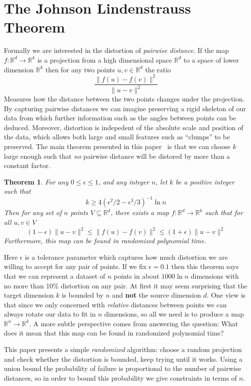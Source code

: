 \documentclass[11pt]{article}
\newcommand{\arr}{\rightarrow}
\newcommand{\R}{\mathbb{R}}
\newtheorem{Thm}{Theorem}
\begin{document}
\section{The Johnson Lindenstrauss Theorem}
Formally we are interested in the distortion of \textit{pairwise distance}. If
the map $f : \R^d \arr \R^k$ is a projection from a high dimensional space
$\R^d$ to a space of lower dimension $\R^k$ then for any two points $u, v \in
\R^d$ the ratio
\[ \frac{\| f(u) - f(v) \|^2}{\| u - v \|^2} \]
Measures how the distance between the two points changes under the projection.
By capturing pairwise distances we can imagine preserving a rigid skeleton of
our data from which further information such as the angles between points can be
deduced. Moreover, distortion is indepedent of the absolute scale and position
of the data, which allows both large and small features such as ``clumps'' to be
preserved. The main theorem presented in this paper~\cite{mainpaper} is that we
can choose $k$ large enough such that \textit{no} pairwise distance will be
distored by more than a constant factor.

\begin{Thm}
  For any $0 \leq \epsilon \leq 1$, and any integer $n$, let $k$ be a positive
  integer such that
  \[ 
    k \geq 4(\epsilon^2/2 - \epsilon^3/3)^{-1} \ln n 
  \]
  Then for any set of $n$ points $V \subseteq \R^d$, there exists a map
  $f:\R^d \arr \R^k$ such that for all $u, v \in V$
  \[
    (1-\epsilon)\|u - v\|^2 \leq \| f(u) - f(v) \|^2 \leq (1+\epsilon) \| u - v \|^2 
  \]
  Furthermore, this map can be found in randomized polynomial time.
\end{Thm}

Here $\epsilon$ is a tolerance parameter which captures how much distortion we
are willing to accept for any pair of points. If we fix $\epsilon = 0.1$ then
this theorem says that we can represent a dataset of $n$ points in about $1000
\ln n$ dimensions with no more than 10\% distortion on any pair. At first it may
seem surprising that the target dimension $k$ is bounded by $n$ and \textbf{not}
the source dimension $d$. One view is that since we only concerned with
\textit{relative} distances between points we can always rotate our data to fit
in $n$ dimensions, so all we need is to produce a map $\R^n \arr \R^k$. A more
subtle perspective comes from answering the question: What does it mean that
this map can be found in randomized polynomial time?

This paper presents a simple \textit{randomized} algorithm: choose a random
projection and check whether the distortion is bounded, keep trying until it
works. Using a union bound the probability of failure is proportional to the
number of pairwise distances, so in order to bound this probability we give
constraints in terms of $n$.
\end{document}
